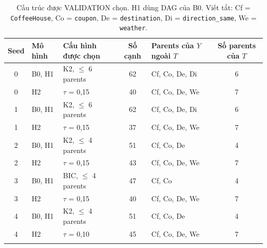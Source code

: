 \documentclass[pdflatex,sn-mathphys-num]{sn-jnl}%
\newcommand{\var}[1]{\texttt{#1}}                 %
\begin{document}
\begin{table}[t]
\caption{Cấu trúc được VALIDATION chọn. H1 dùng DAG của B0. Viết tắt: Cf = \var{CoffeeHouse}, Co = \var{coupon}, De = \var{destination}, Di = \var{direction\_same}, We = \var{weather}.}\label{tab:structure}
\begin{tabular}{@{}cllclc@{}}
\toprule
Seed & Mô hình & Cấu hình được chọn & Số cạnh & Parents của $Y$ ngoài $T$ & Số parents của $T$ \\
\midrule
0 & B0, H1 & K2, $\le$ 6 parents & 62 & Cf, Co, De, Di & 6 \\
0 & H2 & $\tau$ = 0{,}15 & 40 & Cf, Co, De, We & 7 \\
1 & B0, H1 & K2, $\le$ 6 parents & 62 & Cf, Co, De, Di & 6 \\
1 & H2 & $\tau$ = 0{,}15 & 37 & Cf, Co, De, We & 7 \\
2 & B0, H1 & K2, $\le$ 4 parents & 51 & Cf, Co, De & 4 \\
2 & H2 & $\tau$ = 0{,}15 & 43 & Cf, Co, De, We & 7 \\
3 & B0, H1 & BIC, $\le$ 4 parents & 47 & Cf, Co & 4 \\
3 & H2 & $\tau$ = 0{,}15 & 40 & Cf, Co, De, We & 7 \\
4 & B0, H1 & K2, $\le$ 4 parents & 51 & Cf, Co, De & 4 \\
4 & H2 & $\tau$ = 0{,}10 & 45 & Cf, Co, De, We & 7 \\
\botrule
\end{tabular}
\end{table}
\end{document}

